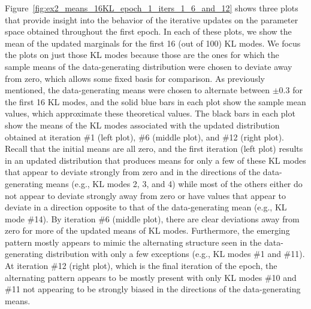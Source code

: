 \documentclass{article}
\begin{document}
Figure~\ref{fig:ex2_means_16KL_epoch_1_iters_1_6_and_12} shows three plots that provide insight into the behavior of the iterative updates on the parameter space obtained throughout the first epoch.
In each of these plots, we show the mean of the updated marginals for the first 16 (out of 100) KL modes.
We focus the plots on just those KL modes because those are the ones for which the sample means of the data-generating distribution were chosen to deviate away from zero, which allows some fixed basis for comparison. 
As previously mentioned, the data-generating means were chosen to alternate between $\pm 0.3$ for the first 16 KL modes, and the solid blue bars in each plot show the sample mean values, which approximate these theoretical values.
The black bars in each plot show the means of the KL modes associated with the updated distribution obtained at iteration \#1 (left plot), \#6 (middle plot), and \#12 (right plot). 
Recall that the initial means are all zero, and the first iteration (left plot) results in an updated distribution that produces means for only a few of these KL modes that appear to deviate strongly from zero and in the directions of the data-generating means (e.g., KL modes 2, 3, and 4) while most of the others either do not appear to deviate strongly away from zero or have values that appear to deviate in a direction opposite to that of the data-generating mean (e.g., KL mode \#14). 
By iteration \#6 (middle plot), there are clear deviations away from zero for more of the updated means of KL modes.
Furthermore, the emerging pattern mostly appears to mimic the alternating structure seen in the data-generating distribution with only a few exceptions (e.g., KL modes \#1 and \#11). 
At iteration \#12 (right plot), which is the final iteration of the epoch, the alternating pattern appears to be mostly present with only KL modes \#10 and \#11 not appearing to be strongly biased in the directions of the data-generating means. 
\end{document}
